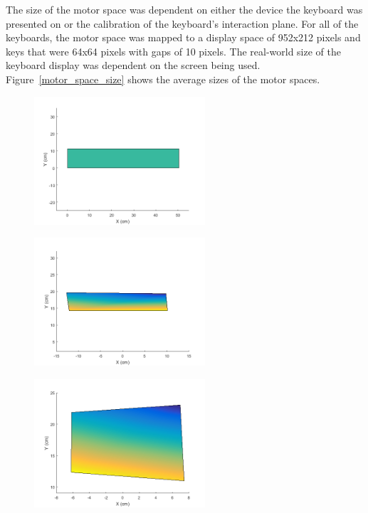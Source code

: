 The size of the motor space was dependent on either the device the keyboard was presented on or the calibration of the keyboard's interaction plane. For all of the keyboards, the motor space was mapped to a display space of 952x212 pixels and keys that were 64x64 pixels with gaps of 10 pixels. The real-world size of the keyboard display was dependent on the screen being used. Figure~\ref{motor_space_size} shows the average sizes of the motor spaces.

\begin{figure}[!t]
	\centering
	\begin{minipage}[t]{2.5in}
		\includegraphics[width=2.5in]{Figures/fig_calibration_touch}
		\label{fig_calibration_touch}
	\end{minipage}
	\begin{minipage}[t]{2.5in}
		\includegraphics[width=2.5in]{Figures/fig_calibration_surface}
		\label{fig_calibration_surface}
	\end{minipage}
	\begin{minipage}[t]{2.5in}
		\includegraphics[width=2.5in]{Figures/fig_calibration_static}

\end{minipage}
\end{figure}
